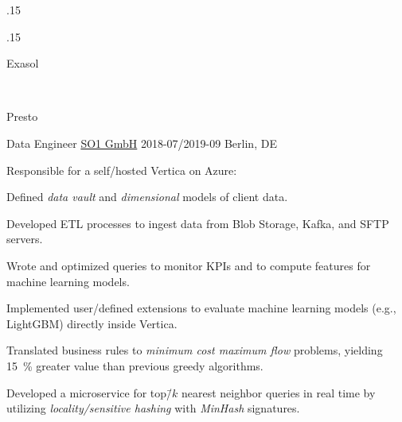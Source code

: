 \documentclass[%
version=last,%
fontsize=11pt,%
paper=A4,%
headinclude=false,%
footinclude=false,%
headlines=0,%
footlines=0,%
areasetadvanced,%
toc=bibnumbered,%
]{scrartcl}%
\begin{document}
\begin{minipage}[t]{0.575\textwidth}
{\begin{vcitemize}[%
      label={},%
      labelsep=0pt,%
      itemindent=0pt,%
      ]
\begin{minipagebox}{.15\linewidth}
      \end{minipagebox}%
      \hfill%
      \begin{minipagebox}[20pt]{.15\linewidth}
        \begin{tcolorbox}[remember as=Exasol]
          Exasol
        \end{tcolorbox}
        \\
        \begin{tcolorbox}[remember as=Presto]
          Presto
        \end{tcolorbox}%
      \end{minipagebox}
      \endgroup%
    \end{vcitemize}%
  }

  \WorkEntry%
  {Data Engineer}%
  {\href{https://www.so1.ai/en/}{SO1 GmbH}}%
  {2018-07/2019-09}%
  {Berlin, DE}%
  {%
    \begin{citemize}
    \item Responsible for a self\-/hosted Vertica on Azure:
      \begin{citemize}
      \item Defined \emph{data vault} and \emph{dimensional} models of client
        data.
      \item Developed ETL processes to ingest data from Blob Storage, Kafka, and
        SFTP servers.
      \item Wrote and optimized queries to monitor KPIs and to compute features
        for machine learning models.
      \item Implemented user\-/defined extensions to evaluate machine learning
        models (e.g., LightGBM) directly inside Vertica.
      \end{citemize}
    \item Translated business rules to \emph{minimum cost maximum flow}
      problems, yielding \SI{15}{\percent} greater value than previous greedy
      algorithms.
    \item Developed a microservice for top\=/\(k\) nearest neighbor queries in
      real time by utilizing \emph{locality\-/sensitive hashing} with
      \emph{MinHash} signatures.
    \end{citemize}%
  }


\end{minipage}
\end{document}
